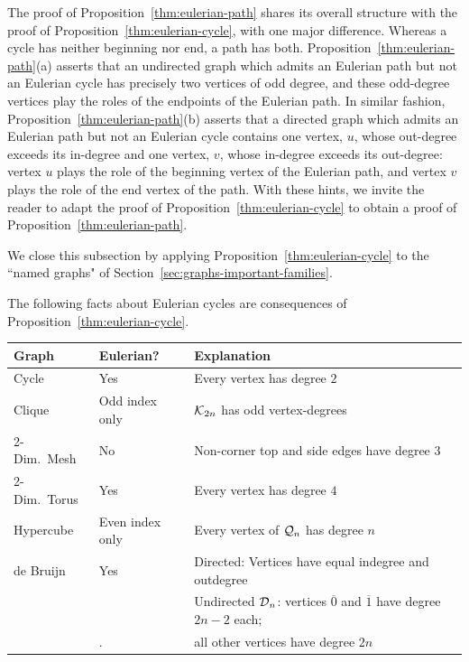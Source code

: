 The proof of Proposition~\ref{thm:eulerian-path} shares its overall structure with the proof of  Proposition~\ref{thm:eulerian-cycle}, with one major difference.  Whereas a cycle has neither beginning nor end, a path has both.  Proposition~\ref{thm:eulerian-path}(a) asserts that an undirected graph which admits an Eulerian path but not an Eulerian cycle has precisely two vertices of odd degree, and these odd-degree vertices play the roles of the endpoints of the Eulerian path.  In similar fashion, Proposition~\ref{thm:eulerian-path}(b) asserts that a directed graph which admits an Eulerian path but not an Eulerian cycle contains one vertex, $u$, whose out-degree exceeds its in-degree and one vertex, $v$, whose in-degree exceeds its out-degree: vertex $u$ plays the role of the beginning vertex of the Eulerian path, and vertex $v$ plays the role of the end vertex of the path.  With these hints, we invite the reader to adapt the proof of Proposition~\ref{thm:eulerian-cycle} to obtain a proof of Proposition~\ref{thm:eulerian-path}.

\bigskip

We close this subsection by applying Proposition~\ref{thm:eulerian-cycle} to the ``named graphs" of Section~\ref{sec:graphs-important-families}.

\medskip

\begin{corol}
\label{corol:eulerian-named-graphs}
The following facts about Eulerian cycles are consequences of Proposition~\ref{thm:eulerian-cycle}.

\medskip

{\small
\begin{tabular}{|l|l|l|}
\hline
Graph & Eulerian? & Explanation \\
\hline \hline
Cycle                          & Yes                          & Every vertex has degree $2$ \\
\hline
Clique                         & Odd index only       & $\mbox{$\cal K$}_{2n}$ has odd vertex-degrees \\
\hline
2-Dim.~Mesh  & No                           & Non-corner top and side edges have degree $3$ \\  
\hline                     
2-Dim.~Torus  & Yes                          & Every vertex has degree $4$ \\
\hline
Hypercube                  & Even index only & Every vertex of $\mbox{$\cal Q$}_n$ has degree $n$ \\
\hline
de Bruijn                     & Yes  & Directed: Vertices have equal {\sc indegree} and {\sc outdegree} \\
                                   &         & Undirected $\mbox{$\cal D$}_n$: vertices $\overline{0}$ and $\overline{1}$ have
                                                  degree $2n-2$ each; \\
                                    &.       & \hspace*{.77in}all other vertices have degree $2n$ \\
\hline
\end{tabular}
}
\end{corol}

